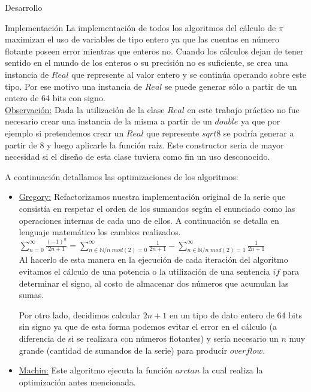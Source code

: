 \begin{section}{Desarrollo}
\begin{subsection}{Implementación}
		La implementación de todos los algoritmos del cálculo de $\pi$ maximizan el uso de variables de tipo entero ya que las cuentas en número flotante poseen error mientras que enteros no. Cuando los cálculos dejan de tener sentido en el mundo de los enteros o su precisión no es suficiente, se crea una instancia de $Real$ que represente al valor entero y se continúa operando sobre este tipo. Por ese motivo una instancia de $Real$ se puede generar sólo a partir de un entero de 64 bits con signo.\\
		
		\underline{Observación:} Dada la utilización de la clase $Real$ en este trabajo práctico no fue necesario crear una instancia de la misma a partir de un $double$ ya que por ejemplo si pretendemos crear un $Real$ que represente $sqrt{8}$ se podría generar a partir de $8$ y luego aplicarle la función raíz. Este constructor seria de mayor necesidad si el diseño de esta clase tuviera como fin un uso desconocido.
		   
	   A continuación detallamos las optimizaciones de los algoritmos:

		\begin{itemize}
			\item \underline{Gregory:} Refactorizamos nuestra implementación original de la serie que consistía en respetar el orden de los sumandos según el enunciado como las operaciones internas de cada uno de ellos. A continuación se detalla en lenguaje matemático los cambios realizados.\\
							
				$\sum_{n=0}^{\infty}\frac{(-1)^n}{2n+1} = \sum_{n \in \mathbb{N} / n\;mod(2)=0}^{\infty}\frac{1}{2n+1}-\sum_{n \in \mathbb{N} / n\;mod(2)=1}^{\infty}\frac{1}{2n+1}$\\
				
				Al hacerlo de esta manera en la ejecución de cada iteración del algoritmo evitamos el cálculo de una potencia o la utilización de una sentencia $if$ para determinar el signo, al costo de almacenar dos números que acumulan las sumas.
				
				Por otro lado, decidimos calcular $2n+1$ en un tipo de dato entero de 64 bits sin signo ya que de esta forma podemos evitar el error en el cálculo (a diferencia de si se realizara con números flotantes) y sería necesario un $n$ muy grande (cantidad de sumandos de la serie) para producir $overflow$.
				
			\item \underline{Machin:} Este algoritmo ejecuta la función $arctan$ la cual realiza la optimización antes mencionada.
			

\end{itemize}
\end{subsection}
\end{section}
